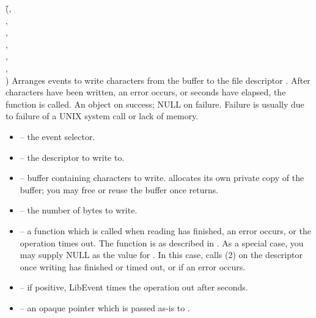 \documentclass{article}
\newcommand{\Le}{\textsf{LibEvent}}
\begin{document}
{(\=,\\
  \> ,\\
  \>,\\
  \> ,\\
  \> ,\\
  \> ,\\
  \>)}
{Arranges events to write  characters from the buffer
   to the file
  descriptor .  After 
  characters have been written, an error occurs, or
   seconds have elapsed, the function  is
  called.}
{An  object on success; NULL on failure.  Failure
  is usually due to failure of a UNIX system call or lack of memory.}
\begin{itemize}
\item {} -- the event selector.
\item {} -- the descriptor to write to.
\item {} -- buffer containing characters to write.
   allocates its own private copy of the buffer;
  you may free or reuse the buffer once  returns.
\item {} -- the number of bytes to write.
\item {} -- a function which is called when reading has finished,
  an error occurs, or the operation times out.  The function 
  is as described in .  As a special case,
  you may supply NULL as the value for .  In this case,
   calls (2) on the descriptor
   once writing has finished or timed out, or if an error
  occurs.
\item {} -- if positive, \Le{} times the operation out
  after  seconds.
\item {} -- an opaque pointer which is passed as-is to
  .
\end{itemize}
\end{document}
